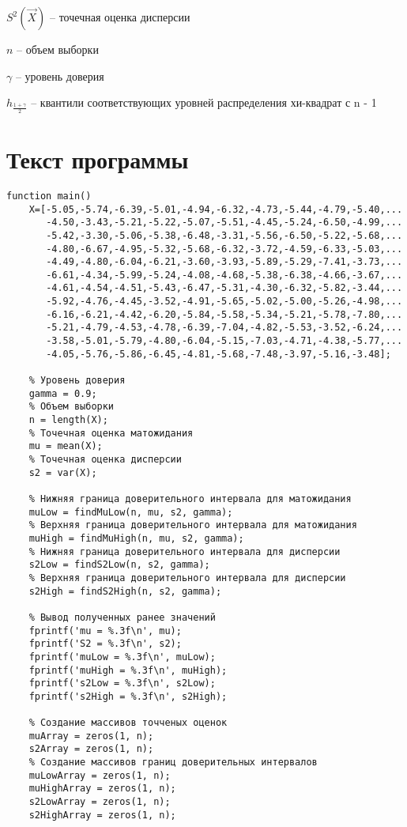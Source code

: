 \documentclass[a4paper,oneside,12pt]{extreport}
\theoremstyle{indented}
\begin{document}
$S^2(\vec X)$ -- точечная оценка дисперсии

$n$ -- объем выборки

$\gamma$ -- уровень доверия

$h_{\frac{1+\gamma}{2}}$ -- квантили соответствующих уровней распределения хи-квадрат с n - 1

\section{Текст программы}

\hfill 
\begin{lstlisting}[caption=Реализация]
function main()
    X=[-5.05,-5.74,-6.39,-5.01,-4.94,-6.32,-4.73,-5.44,-4.79,-5.40,...
       -4.50,-3.43,-5.21,-5.22,-5.07,-5.51,-4.45,-5.24,-6.50,-4.99,...
       -5.42,-3.30,-5.06,-5.38,-6.48,-3.31,-5.56,-6.50,-5.22,-5.68,...
       -4.80,-6.67,-4.95,-5.32,-5.68,-6.32,-3.72,-4.59,-6.33,-5.03,...
       -4.49,-4.80,-6.04,-6.21,-3.60,-3.93,-5.89,-5.29,-7.41,-3.73,...
       -6.61,-4.34,-5.99,-5.24,-4.08,-4.68,-5.38,-6.38,-4.66,-3.67,...
       -4.61,-4.54,-4.51,-5.43,-6.47,-5.31,-4.30,-6.32,-5.82,-3.44,...
       -5.92,-4.76,-4.45,-3.52,-4.91,-5.65,-5.02,-5.00,-5.26,-4.98,...
       -6.16,-6.21,-4.42,-6.20,-5.84,-5.58,-5.34,-5.21,-5.78,-7.80,...
       -5.21,-4.79,-4.53,-4.78,-6.39,-7.04,-4.82,-5.53,-3.52,-6.24,...
       -3.58,-5.01,-5.79,-4.80,-6.04,-5.15,-7.03,-4.71,-4.38,-5.77,...
       -4.05,-5.76,-5.86,-6.45,-4.81,-5.68,-7.48,-3.97,-5.16,-3.48];
   
    % Уровень доверия
    gamma = 0.9;
    % Объем выборки 
    n = length(X);
    % Точечная оценка матожидания
    mu = mean(X);
    % Точечная оценка дисперсии
    s2 = var(X);
    
    % Нижняя граница доверительного интервала для матожидания
    muLow = findMuLow(n, mu, s2, gamma);
    % Верхняя граница доверительного интервала для матожидания
    muHigh = findMuHigh(n, mu, s2, gamma);
    % Нижняя граница доверительного интервала для дисперсии
    s2Low = findS2Low(n, s2, gamma);
    % Верхняя граница доверительного интервала для дисперсии
    s2High = findS2High(n, s2, gamma);
    
    % Вывод полученных ранее значений
    fprintf('mu = %.3f\n', mu);
    fprintf('S2 = %.3f\n', s2);
    fprintf('muLow = %.3f\n', muLow);
    fprintf('muHigh = %.3f\n', muHigh);
    fprintf('s2Low = %.3f\n', s2Low);
    fprintf('s2High = %.3f\n', s2High);
    
    % Создание массивов точченых оценок
    muArray = zeros(1, n);
    s2Array = zeros(1, n);
    % Создание массивов границ доверительных интервалов
    muLowArray = zeros(1, n);
    muHighArray = zeros(1, n);
    s2LowArray = zeros(1, n);
    s2HighArray = zeros(1, n);
    

\end{lstlisting}
\end{document}
